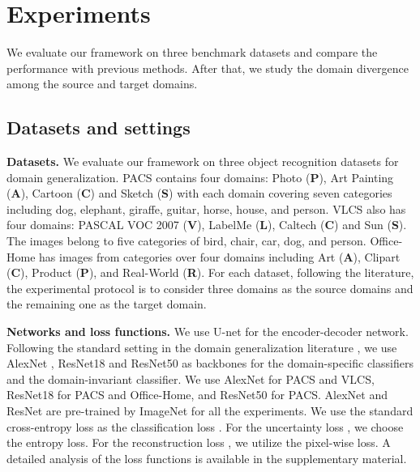 \documentclass{article}
\begin{document}
\section{Experiments}

We evaluate our framework on three benchmark datasets and compare the performance with previous methods. After that, we study the domain divergence among the source and target domains.

\subsection{Datasets and settings}
\label{datasetting}

\textbf{Datasets.} 
We evaluate our framework on three object recognition datasets for domain generalization. PACS \cite{li2017deeper} contains four domains: Photo (\textbf{P}), Art Painting (\textbf{A}), Cartoon (\textbf{C}) and Sketch (\textbf{S}) with each domain covering seven categories including dog, elephant, giraffe, guitar, horse, house, and person. VLCS \cite{torralba2011unbiased} also has four domains: PASCAL VOC 2007 (\textbf{V}), LabelMe (\textbf{L}), Caltech (\textbf{C}) and Sun (\textbf{S}). The images belong to five categories of bird, chair, car, dog, and person. Office-Home \cite{venkateswara2017deep} has images from  categories over four domains including Art (\textbf{A}), Clipart (\textbf{C}), Product (\textbf{P}), and Real-World (\textbf{R}). For each dataset, following the literature, the experimental protocol is to consider three domains as the source domains and the remaining one as the target domain.

\textbf{Networks and loss functions.}
We use U-net \cite{ronneberger2015u} for the encoder-decoder network. Following the standard setting in the domain generalization literature \cite{dou2019domain,zhao2020domain,huangRSC2020}, we use AlexNet \cite{krizhevsky2017imagenet}, ResNet18 \cite{he2016deep} and ResNet50 \cite{he2016deep} as backbones for the domain-specific classifiers and the domain-invariant classifier. We use AlexNet for PACS and VLCS, ResNet18 for PACS and Office-Home, and ResNet50 for PACS. AlexNet and ResNet are pre-trained by ImageNet \cite{russakovsky2015imagenet} for all the experiments. We use the standard cross-entropy loss as the classification loss . For the uncertainty loss , we choose the entropy loss. For the reconstruction loss , we utilize the pixel-wise  loss. A detailed analysis of the loss functions is available in the supplementary material. 
\end{document}
